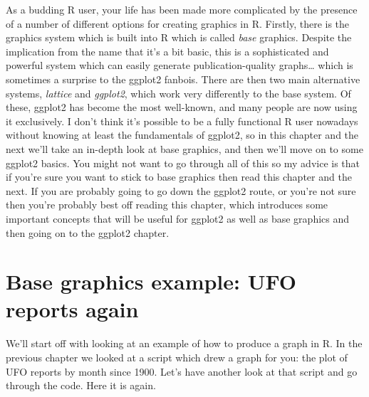 \documentclass[
]{book}
\begin{document}
As a budding R user, your life has been made more complicated by the presence of a number of different options for creating graphics in R. Firstly, there is the graphics system which is built into R which is called \emph{base} graphics. Despite the implication from the name that it's a bit basic, this is a sophisticated and powerful system which can easily generate publication-quality graphs\ldots{} which is sometimes a surprise to the ggplot2 fanbois. There are then two main alternative systems, \emph{lattice} and \emph{ggplot2}, which work very differently to the base system. Of these, ggplot2 has become the most well-known, and many people are now using it exclusively. I don't think it's possible to be a fully functional R user nowadays without knowing at least the fundamentals of ggplot2, so in this chapter and the next we'll take an in-depth look at base graphics, and then we'll move on to some ggplot2 basics. You might not want to go through all of this so my advice is that if you're sure you want to stick to base graphics then read this chapter and the next. If you are probably going to go down the ggplot2 route, or you're not sure then you're probably best off reading this chapter, which introduces some important concepts that will be useful for ggplot2 as well as base graphics and then going on to the ggplot2 chapter.

\hypertarget{base-graphics-example-ufo-reports-again}{%
\section{Base graphics example: UFO reports again}\label{base-graphics-example-ufo-reports-again}}

We'll start off with looking at an example of how to produce a graph in R. In the previous chapter we looked at a script which drew a graph for you: the plot of UFO reports by month since 1900. Let's have another look at that script and go through the code. Here it is again.
\end{document}
